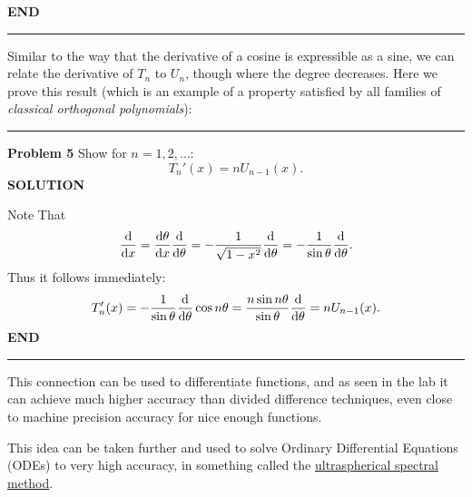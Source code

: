 \documentclass[12pt,a4paper]{article}
\begin{document}
\textbf{END}

\rule{\textwidth}{1pt}
Similar to the way that the derivative of a cosine is expressible as a sine, we can relate the derivative of $T_n$ to $U_n$, though where the degree decreases.  Here we prove this result (which is an example of a property satisfied by all families of \emph{classical orthogonal polynomials}):

\rule{\textwidth}{1pt}
\textbf{Problem 5}  Show for $n = 1, 2, \ensuremath{\ldots}$:
\[
T_n'(x) = n U_{n-1}(x).
\]
\textbf{SOLUTION}

Note That
\[
{{\rm d} \over {\rm d} x} =  {{\rm d} \theta \over {\rm d} x}  {{\rm d} \over {\rm d} \theta}
= -{1 \over \sqrt{1-x^2}} {{\rm d} \over {\rm d} \theta} = -{1 \over \sin \theta} {{\rm d} \over {\rm d} \theta}.
\]
Thus it follows immediately:
\[
T_n'(x) = -{1 \over \sin \theta} {{\rm d} \over {\rm d} \theta} \cos n \theta =
{n \sin n \theta \over \sin \theta} {{\rm d} \over {\rm d} \theta} = n U_{n-1}(x).
\]
\textbf{END}

\rule{\textwidth}{1pt}
This connection can be used to differentiate functions, and as seen in the lab it can achieve much higher accuracy than divided difference techniques, even close to machine precision accuracy for nice enough functions.

This idea can be taken further and used to solve Ordinary Differential Equations (ODEs) to very high accuracy, in something called the \href{https://epubs.siam.org/doi/10.1137/120865458}{ultraspherical spectral method}.
\end{document}
